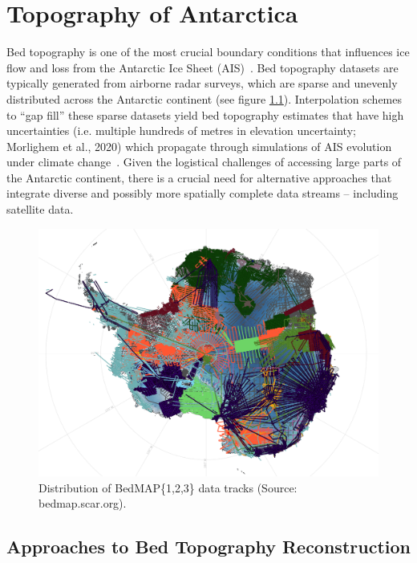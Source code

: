 \chapter{Topography of Antarctica}\label{review}

Bed topography is one of the most crucial boundary conditions that influences ice flow and loss from the Antarctic Ice Sheet (AIS)~\cite{Morlighem_2020}. Bed topography datasets are typically generated from airborne radar surveys, which are sparse and unevenly distributed across the Antarctic continent (see figure \ref{fig:BedMAP}). Interpolation schemes to ``gap fill'' these sparse datasets yield bed topography estimates that have high uncertainties (i.e. multiple hundreds of metres in elevation uncertainty; Morlighem et al., 2020) which propagate through simulations of AIS evolution under climate change~\cite{Castleman_2022}. Given the logistical challenges of accessing large parts of the Antarctic continent, there is a crucial need for alternative approaches that integrate diverse and possibly more spatially complete data streams – including satellite data.
\begin{figure}[H] %
    \includegraphics[scale=0.31]{bedmap.png}
    \caption{Distribution of BedMAP\{1,2,3\} data tracks (Source: bedmap.scar.org).}
    \label{fig:BedMAP}
\end{figure}

\section{Approaches to Bed Topography Reconstruction}

